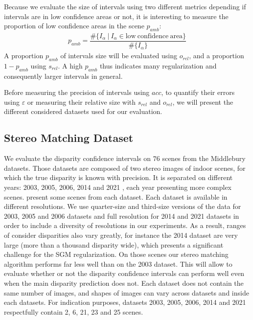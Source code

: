 Because we evaluate the size of intervals using two different metrics depending if intervals are in low confidence areas or not, it is interesting to measure the proportion of low confidence areas in the scene $p_{amb}$:
\begin{align}
    p_{amb} = \dfrac{\#\{I_\alpha ~|~I_\alpha\in\mathrm{low~confidence~area}\}}{\#\{I_\alpha\}}
\end{align}
A proportion $p_{amb}$ of intervals size will be evaluated using $o_{rel}$, and a proportion $1-p_{amb}$ using $s_{rel}$. A high $p_{amb}$ thus indicates many regularization and consequently larger intervals in general.

Before measuring the precision of intervals using $acc$, to quantify their errors using $\varepsilon$ or measuring their relative size with $s_{rel}$ and $o_{rel}$, we will present the different considered datasets used for our evaluation.

\subsection{Stereo Matching Dataset}\label{sec:dataset}
We evaluate the disparity confidence intervals on $76$ scenes from the Middlebury datasets. Those datasets are composed of two stereo images of indoor scenes, for which the true disparity is known with precision. It is separated on different years: 2003, 2005, 2006, 2014 and 2021 \cite{scharstein_high-accuracy_2003, scharstein_learning_2007, hirschmuller_evaluation_2007, scharstein_high-resolution_2014}, each year presenting more complex scenes.  present some scenes from each dataset.  Each dataset is available in different resolutions. We use quarter-size and third-size versions of the data for 2003, 2005 and 2006 datasets and full resolution for 2014 and 2021 datasets in order to include a diversity of resolutions in our experiments. As a result, ranges of consider disparities also vary greatly, for instance the 2014 dataset are very large (more than a thousand disparity wide), which presents a significant challenge for the SGM regularization. On those scenes our stereo matching algorithm performs far less well than on the 2003 dataset. This will allow to evaluate whether or not the disparity confidence intervals can perform well even when the main disparity prediction does not. Each dataset does not contain the same number of images, and shapes of images can vary across datasets and inside each datasets. For indication purposes, datasets 2003, 2005, 2006, 2014 and 2021 respectfully contain 2, 6, 21, 23 and 25 scenes.

